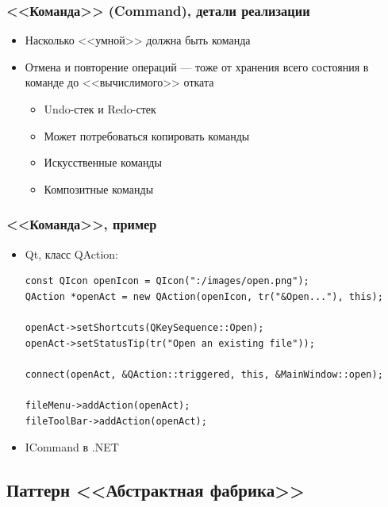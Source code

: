 \documentclass[xetex,mathserif,serif]{beamer}
\begin{document}
    \begin{frame}
        \frametitle{<<Команда>> (Command), детали реализации}
        \begin{itemize}
            \item Насколько <<умной>> должна быть команда
            \item Отмена и повторение операций --- тоже от хранения всего состояния в команде до <<вычислимого>> отката
            \begin{itemize}
                \item Undo-стек и Redo-стек
                \item Может потребоваться копировать команды
                \item Искусственные команды
                \item Композитные команды
            \end{itemize}
        \end{itemize}
    \end{frame}

    \begin{frame}[fragile]
        \frametitle{<<Команда>>, пример}
        \begin{itemize}
            \item Qt, класс QAction:
            \begin{verbatim}
const QIcon openIcon = QIcon(":/images/open.png");
QAction *openAct = new QAction(openIcon, tr("&Open..."), this);

openAct->setShortcuts(QKeySequence::Open);
openAct->setStatusTip(tr("Open an existing file"));

connect(openAct, &QAction::triggered, this, &MainWindow::open);

fileMenu->addAction(openAct);
fileToolBar->addAction(openAct);
            \end{verbatim}
            \item ICommand в .NET
        \end{itemize}
    \end{frame}

    \subsection{Паттерн <<Абстрактная фабрика>>}
\end{document}
